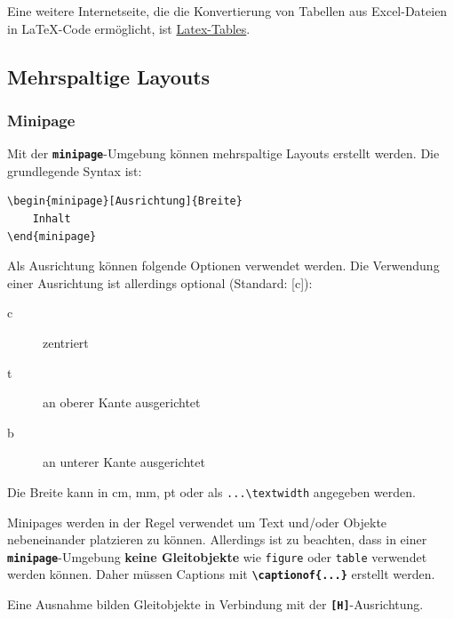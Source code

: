Eine weitere Internetseite, die die Konvertierung von Tabellen aus Excel-Dateien in \LaTeX-Code ermöglicht, ist \href{https://www.latex-tables.com}{Latex-Tables}.


\subsection{Mehrspaltige Layouts}

\subsubsection{Minipage}
\label{sec:minipage}
Mit der \textbf{\texttt{minipage}}-Umgebung können mehrspaltige Layouts erstellt werden.
Die grundlegende Syntax ist:
\begin{lstlisting}[language={[LaTeX]TeX}]
\begin{minipage}[Ausrichtung]{Breite}
    Inhalt
\end{minipage}
\end{lstlisting}

Als Ausrichtung können folgende Optionen verwendet werden. Die Verwendung einer Ausrichtung ist allerdings optional (Standard: [c]):

\begin{description}
    \item[c] zentriert
    \item[t] an oberer Kante ausgerichtet
    \item[b] an unterer Kante ausgerichtet
\end{description}

Die Breite kann in cm, mm, pt oder als \texttt{...\textbackslash textwidth} angegeben werden.

Minipages werden in der Regel verwendet um Text und/oder Objekte nebeneinander platzieren zu können.
Allerdings ist zu beachten, dass in einer \textbf{\texttt{minipage}}-Umgebung \textbf{keine Gleitobjekte} wie \texttt{figure} oder \texttt{table} verwendet werden können. Daher müssen Captions mit \textbf{\texttt{\textbackslash captionof\{...\}}} erstellt werden.

Eine Ausnahme bilden Gleitobjekte in Verbindung mit der \textbf{\texttt{[H]}}-Ausrichtung.

